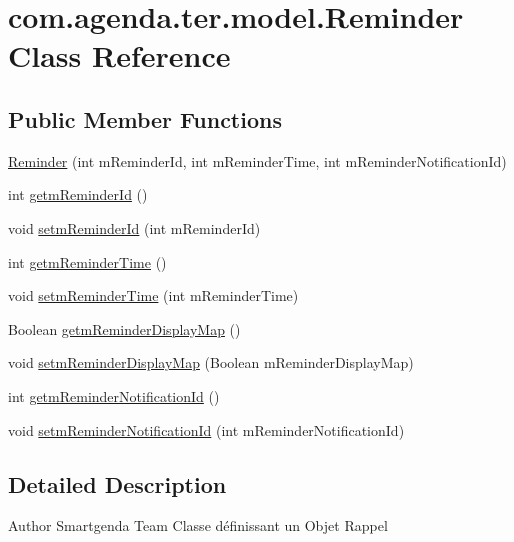 \hypertarget{classcom_1_1agenda_1_1ter_1_1model_1_1_reminder}{\section{com.\-agenda.\-ter.\-model.\-Reminder Class Reference}
\label{classcom_1_1agenda_1_1ter_1_1model_1_1_reminder}
}
\subsection*{Public Member Functions}
\begin{DoxyCompactItemize}
\item 
\hyperlink{classcom_1_1agenda_1_1ter_1_1model_1_1_reminder_ac7f7ec114b3eca7b81507974807c4761}{Reminder} (int m\-Reminder\-Id, int m\-Reminder\-Time, int m\-Reminder\-Notification\-Id)
\item 
int \hyperlink{classcom_1_1agenda_1_1ter_1_1model_1_1_reminder_a73a40ec06017175f895d9d4f2f0cab1c}{getm\-Reminder\-Id} ()
\item 
void \hyperlink{classcom_1_1agenda_1_1ter_1_1model_1_1_reminder_a80a01b0d9d88b1982a2d697900251dce}{setm\-Reminder\-Id} (int m\-Reminder\-Id)
\item 
int \hyperlink{classcom_1_1agenda_1_1ter_1_1model_1_1_reminder_a2db8ad3b490ec594bdd21a92d0ef1021}{getm\-Reminder\-Time} ()
\item 
void \hyperlink{classcom_1_1agenda_1_1ter_1_1model_1_1_reminder_ac71d5be4efafe4ade5afd3f8ac930744}{setm\-Reminder\-Time} (int m\-Reminder\-Time)
\item 
Boolean \hyperlink{classcom_1_1agenda_1_1ter_1_1model_1_1_reminder_aa0f5da81e57ac9d7d8d82fd39c8c6809}{getm\-Reminder\-Display\-Map} ()
\item 
void \hyperlink{classcom_1_1agenda_1_1ter_1_1model_1_1_reminder_a5c796b36b9930874a38398ed919092a9}{setm\-Reminder\-Display\-Map} (Boolean m\-Reminder\-Display\-Map)
\item 
int \hyperlink{classcom_1_1agenda_1_1ter_1_1model_1_1_reminder_a87a39ffd18bfb71511eccdfc4d781b3c}{getm\-Reminder\-Notification\-Id} ()
\item 
void \hyperlink{classcom_1_1agenda_1_1ter_1_1model_1_1_reminder_ac935e9a35c630989d13f9b91f0e97250}{setm\-Reminder\-Notification\-Id} (int m\-Reminder\-Notification\-Id)
\end{DoxyCompactItemize}


\subsection{Detailed Description}
\begin{DoxyAuthor}{Author}
Smartgenda Team Classe définissant un Objet Rappel 
\end{DoxyAuthor}


